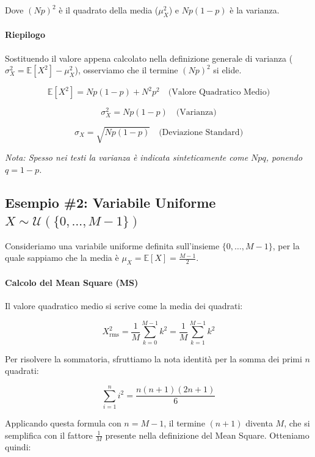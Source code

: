 Dove $(Np)^2$ è il quadrato della media ($\mu_X^2$) e $Np(1-p)$ è la varianza.

\paragraph{Riepilogo}

Sostituendo il valore appena calcolato nella definizione generale di varianza ($\sigma_X^2 = \mathbb{E}[X^2] - \mu_X^2$), osserviamo che il termine $(Np)^2$ si elide.


\begin{equation}
\boxed{\mathbb{E}[X^2] = Np(1-p) + N^2 p^2} \quad \text{(Valore Quadratico Medio)}
\end{equation}

\begin{equation}
\boxed{\sigma_X^2 = Np(1-p)} \quad \text{(Varianza)}
\end{equation}

\begin{equation}
\boxed{\sigma_X = \sqrt{Np(1-p)}} \quad \text{(Deviazione Standard)}
\end{equation}

\textit{Nota: Spesso nei testi la varianza è indicata sinteticamente come $Npq$, ponendo $q = 1-p$.}

\subsection{Esempio \#2: Variabile Uniforme $X \sim \mathcal{U}(\{0, \dots, M-1\})$}

Consideriamo una variabile uniforme definita sull'insieme $\{0, \dots, M-1\}$, per la quale sappiamo che la media è $\mu_X = \mathbb{E}[X] = \frac{M-1}{2}$.

\paragraph{Calcolo del Mean Square (MS)}
Il valore quadratico medio si scrive come la media dei quadrati:

\[
X^2_{\text{rms}} = \frac{1}{M} \sum_{k=0}^{M-1} k^2 = \frac{1}{M} \sum_{k=1}^{M-1} k^2
\]

Per risolvere la sommatoria, sfruttiamo la nota identità per la somma dei primi $n$ quadrati:

\[
\sum_{i=1}^n i^2 = \frac{n(n+1)(2n+1)}{6}
\]

Applicando questa formula con $n = M-1$, il termine $(n+1)$ diventa $M$, che si semplifica con il fattore $\frac{1}{M}$ presente nella definizione del Mean Square. Otteniamo quindi:

